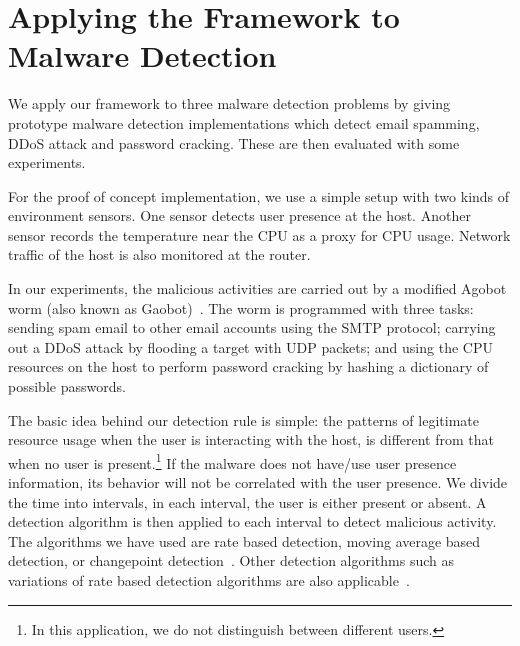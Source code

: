 \section{Applying the Framework to Malware Detection} \label{sec:app-malware}

We apply our framework to three malware detection problems
by giving prototype malware detection implementations which
detect email spamming, DDoS attack and password cracking.
These are then evaluated with some experiments.

For the proof of concept implementation, we use
a simple setup with two kinds of environment sensors.
One sensor detects user presence at the host.
Another sensor records the temperature near the CPU as a proxy
for CPU usage.
Network traffic of the host is also monitored at the router.

In our experiments, the malicious activities are carried out by a
modified Agobot worm (also known as Gaobot)~\cite{Agobot}.
The worm is programmed with three tasks:
sending spam email to other email accounts using the SMTP protocol; 
carrying out a DDoS attack by flooding a target with UDP packets; 
and using the CPU resources on the host to perform password
cracking by hashing a dictionary of possible passwords.

The basic idea behind our detection rule is simple: the patterns of
legitimate resource usage when the user is  interacting with the
host, is different from that when no user is present.\footnote{
In this application, we do not distinguish between different users.
}
If the malware does not have/use user presence information, 
its behavior will not be correlated with the user presence. 
We divide the time into
intervals, in each interval, the user is either present or absent.
A detection algorithm is then applied to each interval to detect
malicious activity. The algorithms we have used are rate based detection,
moving average based detection, or changepoint
detection~\cite{wangInfocom02,ChangpointBook93}. 
Other detection algorithms such as 
variations of rate based detection algorithms are also applicable~\cite{chandola09}.
